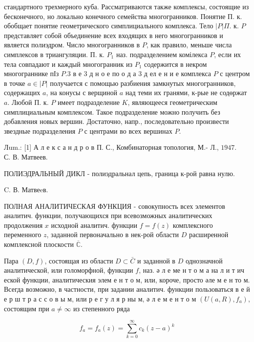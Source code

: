\documentclass[10pt]{article}
\begin{document}
стандартного трехмерного куба. Рассматриваются также комплексы, состоящие из бесконечного, но локально конечного семейства многогранников. Понятие П. к. обобщает понятие геометрического симплициального комплекса. Тело $|P| \Pi$. к. $P$ представляет собой объединение всех входящих в него многогранников и является полиэдром. Число многогранников в $P$, как правило, меньше числа симплексов в триангуляции. П. к. $P_{1}$ наз. подразделением комілекса $P$, если их тела совпадают и каждый многогранник из $P_{1}$ содержится в некром многограннике пІз $P .3$ в е 3 д н о е по о д а 3 д ел е н и е комплекса $P$ с центром в точке $a \in|P|$ получается с помощью разбиения замкнутых многогранников, содержащих $a$, на конусы с верщиной $a$ над теми их гранями, к-рые не содөржат $a$. Любой П. к. $P$ имеет подразделение $K$, являющееся геометрическим симплициальным комплексом. Такое подразделение можно получить без добавления новых вершин. Достаточно, напр., последовательно произвести звездные подразделения $P$ с центрами во всех вершинах $P$.



Лum.: [1] А л е к с а н д р о в П. С., Комбинаторная топология, М.- Л., $1947 . \quad$ С. В. Матвеев.



ПОЛИЭДРАЛЬНЫЙ ДИКЛ - полиэдральнал цепь, граница к-рой равна нулю.



C. В. Матвеeв.



ПОЛНАЯ АНАЛИТИЧЕСКАЯ ФУНКЦИЯ - совокупность всех элементов аналитич. функции, получающихся при всевозможных аналитических продолжения $x$ исходной аналитич. функции $f=f(z)$ комплексного переменного $z$, заданной первоначально в нек-рой области $D$ расширенной комплексной плоскости $\overline{\mathbb{C}}$.



Пара $(D, f)$, состоящая из области $D \subset \bar{C}$ и заданной в $D$ однозначной аналитической, или голоморфной, функции $f$, наз. ә л е ме н т о м а на л и т ич еской функции, аналитическия элем е н т о м, или, короче, просто әле м е н то м. Всегда возможно, в частности, при задании аналитич. функции пользоваться в е й е р ш т р а с с о в ы м, или р е г у л я р ны м, ә л е м е н т о м $\left(U(a, R), f_{a}\right)$, состоящим при $a \neq \infty$ из степенного ряда



\[

f_{a}=f_{a}(z)=\sum_{k=0}^{\infty} c_{k}(z-a)^{k}

\]
\end{document}
